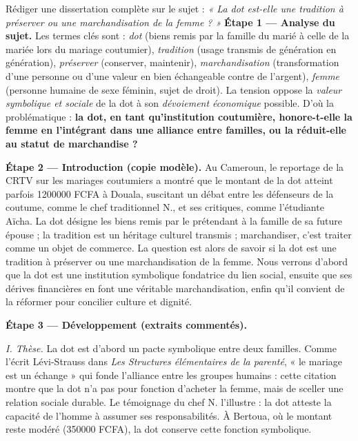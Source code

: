 \documentclass[11pt]{article}
\begin{document}
\begin{exoresolu}
Rédiger une dissertation complète sur le sujet : \emph{« La dot est-elle une tradition à préserver ou une marchandisation de la femme ? »}
\tcblower
\textbf{Étape 1 — Analyse du sujet.} Les termes clés sont : \emph{dot} (biens remis par la famille du marié à celle de la mariée lors du mariage coutumier), \emph{tradition} (usage transmis de génération en génération), \emph{préserver} (conserver, maintenir), \emph{marchandisation} (transformation d'une personne ou d'une valeur en bien échangeable contre de l'argent), \emph{femme} (personne humaine de sexe féminin, sujet de droit). La tension oppose la \emph{valeur symbolique et sociale} de la dot à son \emph{dévoiement économique} possible. D'où la problématique : \textbf{la dot, en tant qu'institution coutumière, honore-t-elle la femme en l'intégrant dans une alliance entre familles, ou la réduit-elle au statut de marchandise ?}

\textbf{Étape 2 — Introduction (copie modèle).} Au Cameroun, le reportage de la CRTV sur les mariages coutumiers a montré que le montant de la dot atteint parfois \num{1200000} FCFA à Douala, suscitant un débat entre les défenseurs de la coutume, comme le chef traditionnel N., et ses critiques, comme l'étudiante Aïcha. La dot désigne les biens remis par le prétendant à la famille de sa future épouse ; la tradition est un héritage culturel transmis ; marchandiser, c'est traiter comme un objet de commerce. La question est alors de savoir si la dot est une tradition à préserver ou une marchandisation de la femme. Nous verrons d'abord que la dot est une institution symbolique fondatrice du lien social, ensuite que ses dérives financières en font une véritable marchandisation, enfin qu'il convient de la réformer pour concilier culture et dignité.

\textbf{Étape 3 — Développement (extraits commentés).}

\emph{I. Thèse.} La dot est d'abord un pacte symbolique entre deux familles. Comme l'écrit Lévi-Strauss dans \emph{Les Structures élémentaires de la parenté}, « le mariage est un échange » qui fonde l'alliance entre les groupes humains : cette citation montre que la dot n'a pas pour fonction d'acheter la femme, mais de sceller une relation sociale durable. Le témoignage du chef N. l'illustre : la dot atteste la capacité de l'homme à assumer ses responsabilités. À Bertoua, où le montant reste modéré (\num{350000} FCFA), la dot conserve cette fonction symbolique.


\end{exoresolu}
\end{document}
